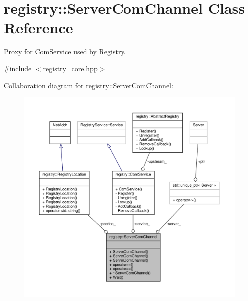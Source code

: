 \hypertarget{classregistry_1_1ServerComChannel}{}\section{registry\+:\+:Server\+Com\+Channel Class Reference}
\label{classregistry_1_1ServerComChannel}


Proxy for \hyperlink{classregistry_1_1ComService}{Com\+Service} used by Registry.  




{\ttfamily \#include $<$registry\+\_\+core.\+hpp$>$}



Collaboration diagram for registry\+:\+:Server\+Com\+Channel\+:\nopagebreak
\begin{figure}[H]
\begin{center}
\leavevmode
\includegraphics[width=350pt]{classregistry_1_1ServerComChannel__coll__graph}
\end{center}
\end{figure}
